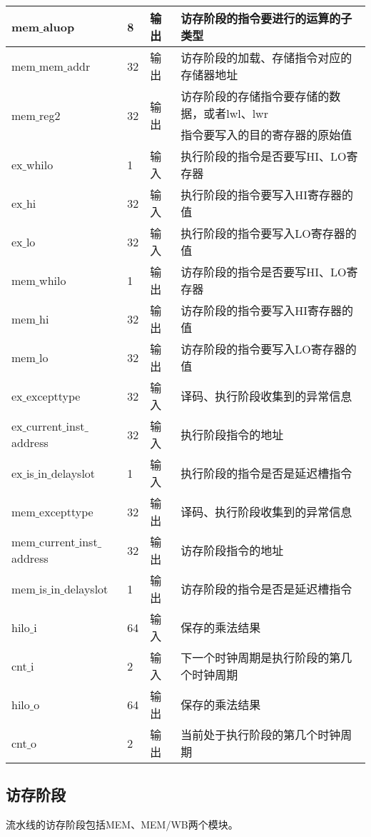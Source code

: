 \begin{longtable}{|l|l|l|l|}
		\hline
		mem$\_$aluop & 8 & 输出 & 访存阶段的指令要进行的运算的子类型 \\
		\hline
		mem$\_$mem$\_$addr & 32 & 输出 & 访存阶段的加载、存储指令对应的存储器地址 \\
		\hline
		\multirow{2}{*}{mem$\_$reg2} & \multirow{2}{*}{32} & \multirow{2}{*}{输出} & 访存阶段的存储指令要存储的数据，或者lwl、lwr \\
		& & & 指令要写入的目的寄存器的原始值 \\
		\hline
		ex$\_$whilo & 1 & 输入 & 执行阶段的指令是否要写HI、LO寄存器 \\
		\hline
		ex$\_$hi & 32 & 输入 & 执行阶段的指令要写入HI寄存器的值 \\
		\hline
		ex$\_$lo & 32 & 输入 & 执行阶段的指令要写入LO寄存器的值 \\
		\hline
		mem$\_$whilo & 1 & 输出 & 访存阶段的指令是否要写HI、LO寄存器 \\
		\hline
		mem$\_$hi & 32 & 输出 & 访存阶段的指令要写入HI寄存器的值 \\
		\hline
		mem$\_$lo & 32 & 输出 & 访存阶段的指令要写入LO寄存器的值 \\
		\hline
		ex$\_$excepttype & 32 & 输入 & 译码、执行阶段收集到的异常信息 \\
		\hline
		ex$\_$current$\_$inst$\_$address & 32 & 输入 & 执行阶段指令的地址 \\
		\hline
		ex$\_$is$\_$in$\_$delayslot & 1 & 输入 & 执行阶段的指令是否是延迟槽指令 \\
		\hline
		mem$\_$excepttype & 32 & 输出 & 译码、执行阶段收集到的异常信息 \\
		\hline
		mem$\_$current$\_$inst$\_$address & 32 & 输出 & 访存阶段指令的地址 \\
		\hline
		mem$\_$is$\_$in$\_$delayslot & 1 & 输出 & 访存阶段的指令是否是延迟槽指令 \\
		\hline
		hilo$\_$i & 64 & 输入 & 保存的乘法结果 \\
		\hline
		cnt$\_$i & 2 & 输入 & 下一个时钟周期是执行阶段的第几个时钟周期 \\
		\hline
		hilo$\_$o & 64 & 输出 & 保存的乘法结果 \\
		\hline
		cnt$\_$o & 2 & 输出 & 当前处于执行阶段的第几个时钟周期 \\
		\hline
	\end{longtable}
\subsection{访存阶段}
流水线的访存阶段包括MEM、MEM/WB两个模块。
